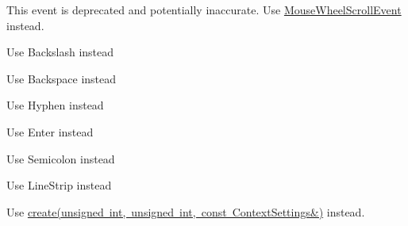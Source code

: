 
\begin{DoxyRefList}
\item[\label{deprecated__deprecated000018}%
\Hypertarget{deprecated__deprecated000018}%
Class \mbox{\hyperlink{structsf_1_1_event_1_1_mouse_wheel_event}{sf\+:\+:Event\+:\+:Mouse\+Wheel\+Event}} ]This event is deprecated and potentially inaccurate. Use \mbox{\hyperlink{structsf_1_1_event_1_1_mouse_wheel_scroll_event}{Mouse\+Wheel\+Scroll\+Event}} instead.  
\item[\label{deprecated__deprecated000021}%
\Hypertarget{deprecated__deprecated000021}%
Member \mbox{\hyperlink{classsf_1_1_keyboard_acb4cacd7cc5802dec45724cf3314a142a536df84e73859aa44e11e192459470b6}{sf\+:\+:Keyboard\+:\+:Back\+Slash}} ]Use Backslash instead  
\item[\label{deprecated__deprecated000020}%
\Hypertarget{deprecated__deprecated000020}%
Member \mbox{\hyperlink{classsf_1_1_keyboard_acb4cacd7cc5802dec45724cf3314a142a33aeaab900abcd01eebf2fcc4f6d97e2}{sf\+:\+:Keyboard\+:\+:Back\+Space}} ]Use Backspace instead  
\item[\label{deprecated__deprecated000019}%
\Hypertarget{deprecated__deprecated000019}%
Member \mbox{\hyperlink{classsf_1_1_keyboard_acb4cacd7cc5802dec45724cf3314a142a401a183dcfde0a06cb60fe6c91fa1e39}{sf\+:\+:Keyboard\+:\+:Dash}} ]Use Hyphen instead  
\item[\label{deprecated__deprecated000023}%
\Hypertarget{deprecated__deprecated000023}%
Member \mbox{\hyperlink{classsf_1_1_keyboard_acb4cacd7cc5802dec45724cf3314a142ac291de81bdee518d636bc359f2ca77de}{sf\+:\+:Keyboard\+:\+:Return}} ]Use Enter instead  
\item[\label{deprecated__deprecated000022}%
\Hypertarget{deprecated__deprecated000022}%
Member \mbox{\hyperlink{classsf_1_1_keyboard_acb4cacd7cc5802dec45724cf3314a142a460ab09a36f9ed230504b89b9815de88}{sf\+:\+:Keyboard\+:\+:Semi\+Colon}} ]Use Semicolon instead  
\item[\label{deprecated__deprecated000001}%
\Hypertarget{deprecated__deprecated000001}%
Member \mbox{\hyperlink{group__graphics_gga5ee56ac1339984909610713096283b1ba5b09910f5d0f39641342184ccd0d1de3}{sf\+:\+:Lines\+Strip}} ]Use Line\+Strip instead  
\item[\label{deprecated__deprecated000004}%
\Hypertarget{deprecated__deprecated000004}%
Member \mbox{\hyperlink{classsf_1_1_render_texture_aaec1fb8ee77844da50b0143cb41c8a71}{sf\+:\+:Render\+Texture\+:\+:create}} (unsigned int width, unsigned int height, bool depth\+Buffer)]Use \mbox{\hyperlink{classsf_1_1_render_texture_a49b7b723a80f89bc409a942364351dc3}{create(unsigned int, unsigned int, const Context\+Settings\&)}} instead.  

\end{DoxyRefList}
